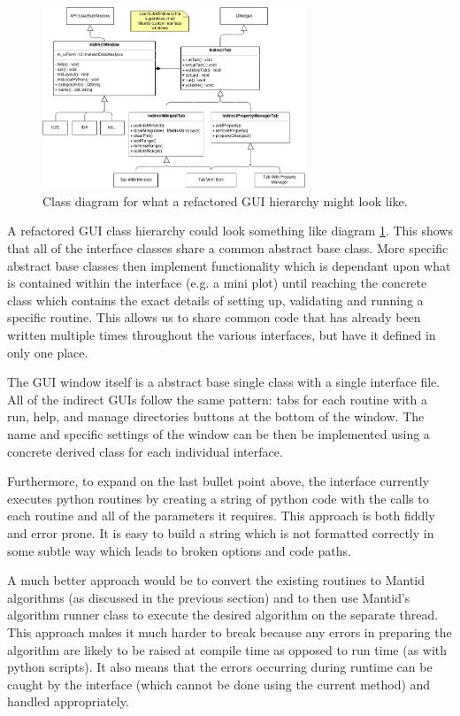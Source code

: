 \documentclass[paper=a4, fontsize=11pt]{scrartcl}	%
\numberwithin{equation}{section}															%
\numberwithin{figure}{section}																%
\numberwithin{table}{section}																%
\begin{document}
\begin{figure}[H]
\centering
\includegraphics[width=0.7\textwidth]{img/uml/class_diagrams/IndirectGUI_structure_proposed.png}
\caption{Class diagram for what a refactored GUI hierarchy might look like.}
\label{fig:indirect-gui-proposed}
\end{figure}

A refactored GUI class hierarchy could look something like diagram \ref{fig:indirect-gui-proposed}. This shows that all of the interface classes share a common abstract base class. More specific abstract base classes then implement functionality which is dependant upon what is contained within the interface (e.g. a mini plot) until reaching the concrete class which contains the exact details of setting up, validating and running a specific routine. This allows us to share common code that has already been written multiple times throughout the various interfaces, but have it defined in only one place. 

The GUI window itself is a abstract base single class with a single interface file. All of the indirect GUIs follow the same pattern: tabs for each routine with a run, help, and manage directories buttons at the bottom of the window. The name and specific settings of the window can be then be implemented using a concrete derived class for each individual interface.

Furthermore, to expand on the last bullet point above, the interface currently executes python routines by creating a string of python code with the calls to each routine and all of the parameters it requires. This approach is both fiddly and error prone. It is easy to build a string which is not formatted correctly in some subtle way which leads to broken options and code paths.

A much better approach would be to convert the existing routines to Mantid algorithms (as discussed in the previous section) and to then use Mantid's algorithm runner class to execute the desired algorithm on the separate thread. This approach makes it much harder to break because any errors in preparing the algorithm are likely to be raised at compile time as opposed to run time (as with python scripts). It also means that the errors occurring during runtime can be caught by the interface (which cannot be done using the current method) and handled appropriately. 
\end{document}
